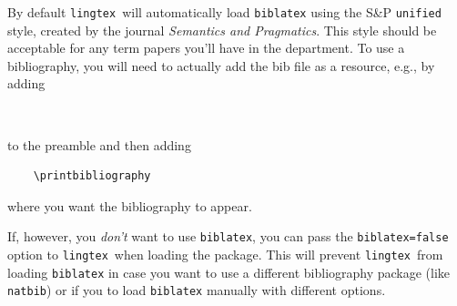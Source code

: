 \documentclass{article}
\def\lingtex{\texttt{lingtex}}
\begin{document}
By default \lingtex\ will automatically load \texttt{biblatex} using the S\&P \verb|unified| style, created by the journal \emph{Semantics and Pragmatics}. This style should be acceptable for any term papers you'll have in the department. To use a bibliography, you will need to actually add the bib file as a resource, e.g., by adding
\begin{verbatim}
    
\end{verbatim}
to the preamble and then adding
\begin{verbatim}
    \printbibliography
\end{verbatim}
where you want the bibliography to appear.

If, however, you \emph{don't} want to use \texttt{biblatex}, you can pass the \verb|biblatex=false| option to \lingtex\ when loading the package. This will prevent \lingtex\ from loading \texttt{biblatex} in case you want to use a different bibliography package (like \texttt{natbib}) or if you to load \texttt{biblatex} manually with different options.
\end{document}
